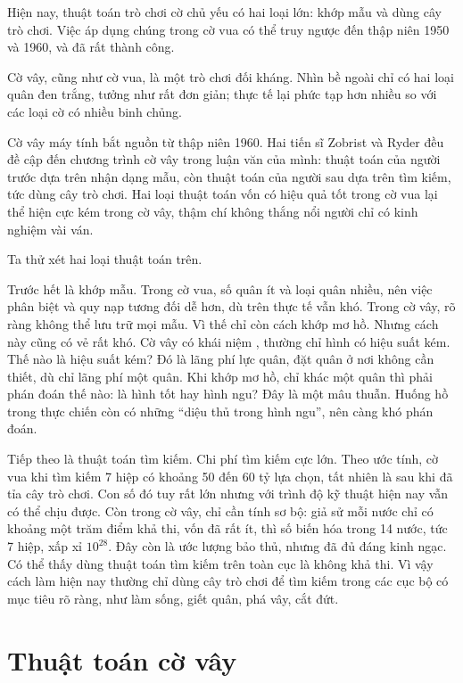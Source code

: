 \documentclass[11pt]{article}
\begin{document}
Hiện nay, thuật toán trò chơi cờ chủ yếu có hai loại lớn: khớp mẫu và dùng
cây trò chơi. Việc áp dụng chúng trong cờ vua có thể truy ngược đến thập niên
1950 và 1960, và đã rất thành công.

Cờ vây, cũng như cờ vua, là một trò chơi đối kháng. Nhìn bề ngoài chỉ có hai
loại quân đen trắng, tưởng như rất đơn giản; thực tế lại phức tạp hơn nhiều
so với các loại cờ có nhiều binh chủng.

Cờ vây máy tính bắt nguồn từ thập niên 1960. Hai tiến sĩ Zobrist và Ryder đều
đề cập đến chương trình cờ vây trong luận văn của mình: thuật toán của người
trước dựa trên nhận dạng mẫu, còn thuật toán của người sau dựa trên tìm kiếm,
tức dùng cây trò chơi. Hai loại thuật toán vốn có hiệu quả tốt trong cờ vua
lại thể hiện cực kém trong cờ vây, thậm chí không thắng nổi người chỉ có kinh
nghiệm vài ván.

Ta thử xét hai loại thuật toán trên.

Trước hết là khớp mẫu. Trong cờ vua, số quân ít và loại quân nhiều, nên việc
phân biệt và quy nạp tương đối dễ hơn, dù trên thực tế vẫn khó. Trong cờ vây,
rõ ràng không thể lưu trữ mọi mẫu. Vì thế chỉ còn cách khớp mơ hồ. Nhưng cách
này cũng có vẻ rất khó. Cờ vây có khái niệm , thường chỉ hình
có hiệu suất kém. Thế nào là hiệu suất kém? Đó là lãng phí lực quân, đặt quân
ở nơi không cần thiết, dù chỉ lãng phí một quân. Khi khớp mơ hồ, chỉ khác một
quân thì phải phán đoán thế nào: là hình tốt hay hình ngu? Đây là một mâu
thuẫn. Huống hồ trong thực chiến còn có những ``diệu thủ trong hình ngu'', nên
càng khó phán đoán.

Tiếp theo là thuật toán tìm kiếm. Chi phí tìm kiếm cực lớn. Theo ước tính,
cờ vua khi tìm kiếm 7 hiệp có khoảng 50 đến 60 tỷ lựa chọn, tất nhiên là sau
khi đã tỉa cây trò chơi. Con số đó tuy rất lớn nhưng với trình độ kỹ thuật
hiện nay vẫn có thể chịu được. Còn trong cờ vây, chỉ cần tính sơ bộ: giả sử
mỗi nước chỉ có khoảng một trăm điểm khả thi, vốn đã rất ít, thì số biến hóa
trong 14 nước, tức 7 hiệp, xấp xỉ \(10^{28}\). Đây còn là ước lượng bảo thủ,
nhưng đã đủ đáng kinh ngạc. Có thể thấy dùng thuật toán tìm kiếm trên toàn
cục là không khả thi. Vì vậy cách làm hiện nay thường chỉ dùng cây trò chơi
để tìm kiếm trong các cục bộ có mục tiêu rõ ràng, như làm sống, giết quân,
phá vây, cắt đứt.

\section{Thuật toán cờ vây}
\end{document}
